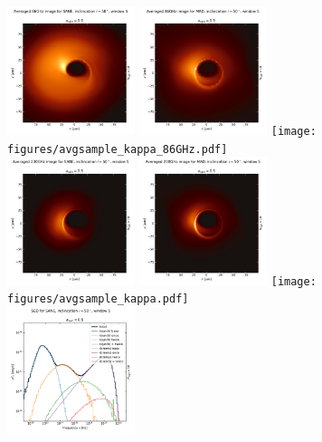 \begin{figure}
  \centering
  \includegraphics[width=0.333\textwidth]{figures/avgsample_SANE_86GHz.pdf}%
  \includegraphics[width=0.333\textwidth]{figures/avgsample_MAD_86GHz.pdf}%
  \texttt{[image: figures/avgsample\_kappa\_86GHz.pdf]}\\
  \includegraphics[width=0.333\textwidth]{figures/avgsample_SANE.pdf}%
  \includegraphics[width=0.333\textwidth]{figures/avgsample_MAD.pdf}%
  \texttt{[image: figures/avgsample\_kappa.pdf]}\\
  \includegraphics[width=0.333\textwidth]{figures/sedsample_SANE.pdf}%

\end{figure}
